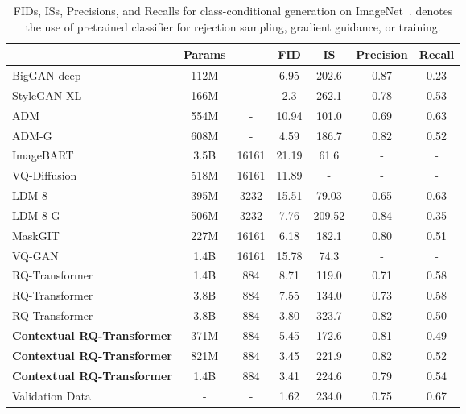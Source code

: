 \documentclass{article}
\newcommand{\ARmodel}{Contextual RQ-Transformer }
\begin{document}
\begin{table} \centering
\small
\caption{FIDs, ISs, Precisions, and Recalls for class-conditional generation on ImageNet~\cite{deng2009imagenet}.  denotes the use of pretrained classifier for rejection sampling, gradient guidance, or training.}
\label{tab:result_cIN}
\begin{tabular}{l|c|c|cccc}
\toprule 
  & Params &  & FID & IS & Precision & Recall \\ \hline
BigGAN-deep~\cite{BigGAN} & 112M & - & 6.95 & 202.6 & 0.87 & 0.23  \\ 
StyleGAN-XL~\cite{styleganXL} & 166M & - & 2.3 & 262.1 & 0.78 & 0.53 \\ \hline
ADM~\cite{ADM} & 554M & - & 10.94 & 101.0 & 0.69 & 0.63\\ 
ADM-G~\cite{ADM} & 608M & - & 4.59 & 186.7 & 0.82 & 0.52 \\ 
ImageBART~\cite{ImageBART} & 3.5B & 16161 & 21.19 & 61.6 & - & -\\ 
VQ-Diffusion~\cite{VQDiff} & 518M & 16161 & 11.89 & - & - & -  \\ 
LDM-8~\cite{LDM} & 395M & 3232 & 15.51 & 79.03 & 0.65 & 0.63 \\
LDM-8-G~\cite{LDM} & 506M & 3232 & 7.76 & 209.52 & 0.84 & 0.35 \\
MaskGIT~\cite{MaskGIT} & 227M & 16161 & 6.18 & 182.1 & 0.80 & 0.51 \\ \hline
VQ-GAN~\cite{VQGAN} & 1.4B & 16161 & 15.78 & 74.3 & - & - \\ RQ-Transformer~\cite{RQVAE} & 1.4B & 884 & 8.71 & 119.0 & 0.71 & 0.58 \\ 
RQ-Transformer~\cite{RQVAE} & 3.8B & 884 & 7.55 & 134.0 & 0.73 & 0.58 \\
RQ-Transformer~\cite{RQVAE} & 3.8B & 884 & 3.80 & 323.7 & 0.82 & 0.50 \\ \hline
\textbf{\ARmodel} & 371M & 884 & 5.45 & 172.6 & 0.81 & 0.49\\
\textbf{\ARmodel} & 821M & 884 & 3.45 & 221.9 & 0.82 & 0.52\\
\textbf{\ARmodel} & 1.4B & 884 & 3.41 & 224.6 & 0.79 & 0.54\\ \hline
Validation Data & - & - & 1.62 & 234.0 & 0.75 & 0.67 \\ 
\bottomrule
\end{tabular}
\end{table}
\end{document}
